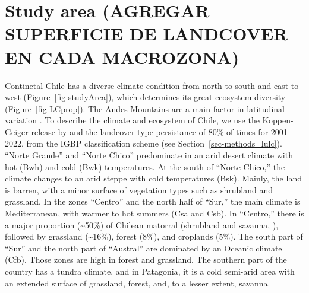 \documentclass[
  authoryear,
  preprint,
  3p,
  onecolumn]{elsarticle}
\begin{document}
\hypertarget{study-area-agregar-superficie-de-landcover-en-cada-macrozona}{%
\section{Study area (AGREGAR SUPERFICIE DE LANDCOVER EN CADA
MACROZONA)}\label{study-area-agregar-superficie-de-landcover-en-cada-macrozona}}

Continetal Chile has a diverse climate condition from north to south and
east to west \citep{Aceituno2021} (Figure~\ref{fig-studyArea}), which
determines its great ecosystem diversity (Figure~\ref{fig-LCprop}). The
Andes Mountains are a main factor in latitudinal variation
\citep{Garreaud2009}. To describe the climate and ecosystem of Chile, we
use the Koppen-Geiger release by \citet{Beck2023} and the landcover type
persistance of 80\% of times for 2001--2022, from the IGBP
classification scheme \citep{Friedl2019} (see
Section~\ref{sec-methods_lulc}). ``Norte Grande'' and ``Norte Chico''
predominate in an arid desert climate with hot (Bwh) and cold (Bwk)
temperatures. At the south of ``Norte Chico,'' the climate changes to an
arid steppe with cold temperatures (Bsk). Mainly, the land is barren,
with a minor surface of vegetation types such as shrubland and
grassland. In the zones ``Centro'' and the north half of ``Sur,'' the
main climate is Mediterranean, with warmer to hot summers (Csa and Csb).
In ``Centro,'' there is a major proportion (\textasciitilde50\%) of
Chilean matorral (shrubland and savanna, \citep{Fuentes2021}), followed
by grassland (\textasciitilde16\%), forest (8\%), and croplands (5\%).
The south part of ``Sur'' and the north part of ``Austral'' are
dominated by an Oceanic climate (Cfb). Those zones are high in forest
and grassland. The southern part of the country has a tundra climate,
and in Patagonia, it is a cold semi-arid area with an extended surface
of grassland, forest, and, to a lesser extent, savanna.
\end{document}

